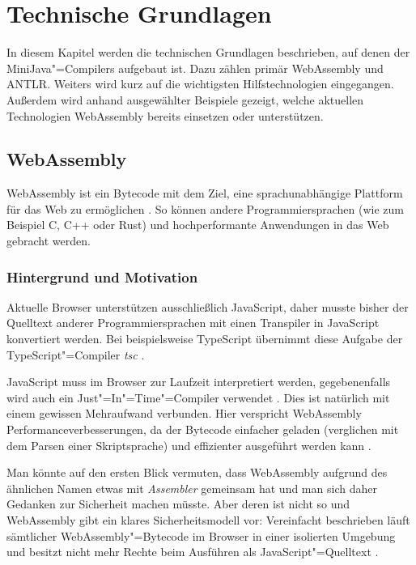 \chapter{Technische Grundlagen}
\label{cha:Technische-Grundlagen}

In diesem Kapitel werden die technischen Grundlagen beschrieben, auf denen der MiniJava"=Compilers aufgebaut ist. Dazu zählen primär WebAssembly und ANTLR. Weiters wird kurz auf die wichtigsten Hilfstechnologien eingegangen. Außerdem wird anhand ausgewählter Beispiele gezeigt, welche aktuellen Technologien WebAssembly bereits einsetzen oder unterstützen.

\section{WebAssembly}
WebAssembly ist ein Bytecode mit dem Ziel, eine sprachunabhängige Plattform für das Web zu ermöglichen \cite{WebAssemblyWebsite} \cite{WebAssemblySpecification}. So können andere Programmiersprachen (wie zum Beispiel C, C++ oder Rust) und hochperformante Anwendungen in das Web gebracht werden.

\subsection{Hintergrund und Motivation}
Aktuelle Browser unterstützen ausschließlich JavaScript, daher musste bisher der Quelltext anderer Programmiersprachen mit einen Transpiler in JavaScript konvertiert werden. Bei beispielsweise TypeScript übernimmt diese Aufgabe der TypeScript"=Compiler \emph{tsc} \cite{TypeScript}.

JavaScript muss im Browser zur Laufzeit interpretiert werden, gegebenenfalls wird auch ein Just"=In"=Time"=Compiler verwendet \cite{MDNJavaScript}. Dies ist natürlich mit einem gewissen Mehraufwand verbunden. Hier verspricht WebAssembly Performanceverbesserungen, da der Bytecode einfacher geladen (verglichen mit dem Parsen einer Skriptsprache) und effizienter ausgeführt werden kann \cite{WebAssemblySpecification}.

Man könnte auf den ersten Blick vermuten, dass WebAssembly aufgrund des ähnlichen Namen etwas mit \emph{Assembler} gemeinsam hat und man sich daher Gedanken zur Sicherheit machen müsste. Aber deren ist nicht so und WebAssembly gibt ein klares Sicherheitsmodell vor: Vereinfacht beschrieben läuft sämtlicher WebAssembly"=Bytecode im Browser in einer isolierten Umgebung und besitzt nicht mehr Rechte beim Ausführen als JavaScript"=Quelltext \cite{WebAssemblyWebsite} \cite{WebAssemblyW3CPressStandard}.

